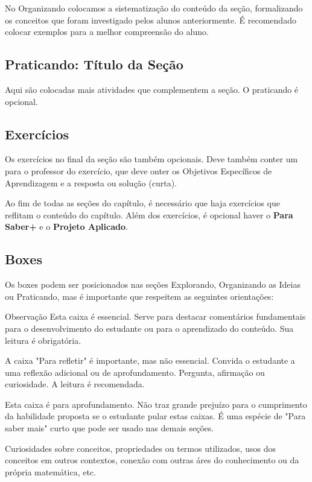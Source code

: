 No Organizando colocamos a sistematização do conteúdo da seção, formalizando os conceitos que foram investigado pelos alunos anteriormente. É recomendado colocar exemplos para a melhor compreensão do aluno.

\def\currentcolor{session2}
\subsection{Praticando: Título da Seção}

Aqui são colocadas mais atividades que complementem a seção. O praticando é opcional.

\def\currentcolor{primario}
\subsection{Exercícios}

Os exercícios no final da seção são também opcionais. Deve também conter um para o professor do exercício, que deve onter os Objetivos Específicos de Aprendizagem e a resposta ou solução (curta).


Ao fim de todas as seções do capítulo, é necessário que haja exercícios que reflitam o conteúdo do capítulo. Além dos exercícios, é opcional haver o \textcolor{session3}{\textbf{Para Saber+}} e o \textcolor{cor2}{\textbf{Projeto Aplicado}}.

\def\currentcolor{session3}
\subsection{Boxes}

Os boxes podem ser posicionados nas seções Explorando, Organizando as Ideias ou Praticando, mas é importante que respeitem as seguintes orientações:

\begin{observation}{Observação}
Esta caixa é essencial. Serve para destacar comentários fundamentais para o desenvolvimento do estudante ou para o aprendizado do conteúdo. Sua leitura é obrigatória.
\end{observation}
\clearpage
\begin{reflection}
A caixa "Para refletir"{} é importante, mas não essencial. Convida o estudante a uma reflexão adicional ou de aprofundamento. Pergunta, afirmação ou curiosidade. A leitura é recomendada.
\end{reflection}

\begin{knowledge}
Esta caixa é para aprofundamento. Não traz grande prejuízo para o cumprimento da habilidade proposta se o estudante pular estas caixas. É uma espécie de "Para saber mais"{ curto que pode ser usado nas demais seções}.

Curiosidades sobre conceitos, propriedades ou termos utilizados, usos dos conceitos em outros contextos, conexão com outras áres do conhecimento ou da própria matemática, etc.
\end{knowledge}